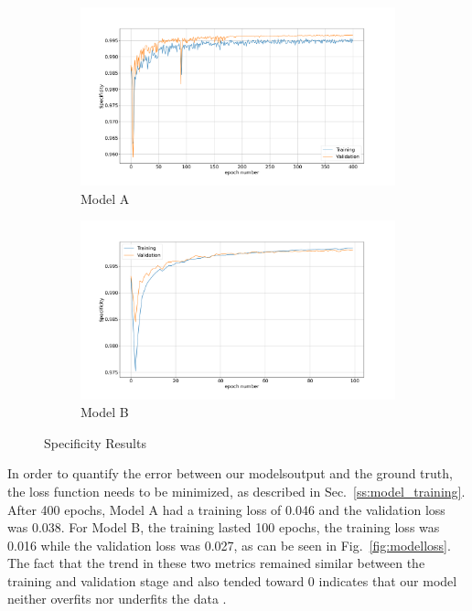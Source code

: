 \documentclass[12pt,a4paper]{scrartcl}
\begin{document}
\begin{figure}[H]
\centering
\begin{subfigure}{1\textwidth}
  \centering
  \includegraphics[width=\linewidth]{./results/model_a_specificity.png}
  \caption{Model A}
  \label{fig:model_a_specificity}
\end{subfigure}
\begin{subfigure}{1\textwidth}
  \centering
  \includegraphics[width=\linewidth]{./results/model_b_specificity.png}
  \caption{Model B}
  \label{fig:modelb_specificity}
\end{subfigure}
\caption{Specificity Results}
\label{fig:specificity_results}
\end{figure}

In order to quantify the error between our models\textquotesingle  output and the ground truth, the loss function needs to be minimized, as described in Sec.~\ref{ss:model_training}. After 400 epochs, Model A had a training loss of 0.046 and the validation loss was 0.038. For Model B, the training lasted 100 epochs, the training loss was 0.016 while the validation loss was 0.027, as can be seen in Fig.~\ref{fig:modelloss}. The fact that the trend in these two metrics remained similar between the training and validation stage and also tended toward 0 indicates that our model neither overfits nor underfits the data \cite{DIDLBook}. 
\end{document}
